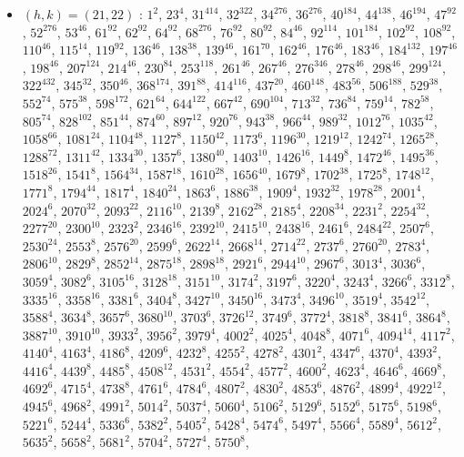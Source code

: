 \begin{itemize}
\item $(h,k)=(21,22)$ : $1^{2}$, $23^{4}$, $31^{414}$, $32^{322}$, $34^{276}$, $36^{276}$, $40^{184}$, $44^{138}$, $46^{194}$, $47^{92}$, $52^{276}$, $53^{46}$, $61^{92}$, $62^{92}$, $64^{92}$, $68^{276}$, $76^{92}$, $80^{92}$, $84^{46}$, $92^{114}$, $101^{184}$, $102^{92}$, $108^{92}$, $110^{46}$, $115^{14}$, $119^{92}$, $136^{46}$, $138^{38}$, $139^{46}$, $161^{70}$, $162^{46}$, $176^{46}$, $183^{46}$, $184^{132}$, $197^{46}$, $198^{46}$, $207^{124}$, $214^{46}$, $230^{84}$, $253^{118}$, $261^{46}$, $267^{46}$, $276^{346}$, $278^{46}$, $298^{46}$, $299^{124}$, $322^{432}$, $345^{32}$, $350^{46}$, $368^{174}$, $391^{88}$, $414^{116}$, $437^{20}$, $460^{148}$, $483^{56}$, $506^{188}$, $529^{38}$, $552^{74}$, $575^{38}$, $598^{172}$, $621^{64}$, $644^{122}$, $667^{42}$, $690^{104}$, $713^{32}$, $736^{84}$, $759^{14}$, $782^{58}$, $805^{74}$, $828^{102}$, $851^{44}$, $874^{60}$, $897^{12}$, $920^{76}$, $943^{38}$, $966^{44}$, $989^{32}$, $1012^{76}$, $1035^{42}$, $1058^{66}$, $1081^{24}$, $1104^{48}$, $1127^{8}$, $1150^{42}$, $1173^{6}$, $1196^{30}$, $1219^{12}$, $1242^{74}$, $1265^{28}$, $1288^{72}$, $1311^{42}$, $1334^{30}$, $1357^{6}$, $1380^{40}$, $1403^{10}$, $1426^{16}$, $1449^{8}$, $1472^{46}$, $1495^{36}$, $1518^{26}$, $1541^{8}$, $1564^{34}$, $1587^{18}$, $1610^{28}$, $1656^{40}$, $1679^{8}$, $1702^{38}$, $1725^{8}$, $1748^{12}$, $1771^{8}$, $1794^{44}$, $1817^{4}$, $1840^{24}$, $1863^{6}$, $1886^{38}$, $1909^{4}$, $1932^{32}$, $1978^{28}$, $2001^{4}$, $2024^{6}$, $2070^{32}$, $2093^{22}$, $2116^{10}$, $2139^{8}$, $2162^{28}$, $2185^{4}$, $2208^{34}$, $2231^{2}$, $2254^{32}$, $2277^{20}$, $2300^{10}$, $2323^{2}$, $2346^{16}$, $2392^{10}$, $2415^{10}$, $2438^{16}$, $2461^{6}$, $2484^{22}$, $2507^{6}$, $2530^{24}$, $2553^{8}$, $2576^{20}$, $2599^{6}$, $2622^{14}$, $2668^{14}$, $2714^{22}$, $2737^{6}$, $2760^{20}$, $2783^{4}$, $2806^{10}$, $2829^{8}$, $2852^{14}$, $2875^{18}$, $2898^{18}$, $2921^{6}$, $2944^{10}$, $2967^{6}$, $3013^{4}$, $3036^{6}$, $3059^{4}$, $3082^{6}$, $3105^{16}$, $3128^{18}$, $3151^{10}$, $3174^{2}$, $3197^{6}$, $3220^{4}$, $3243^{4}$, $3266^{6}$, $3312^{8}$, $3335^{16}$, $3358^{16}$, $3381^{6}$, $3404^{8}$, $3427^{10}$, $3450^{16}$, $3473^{4}$, $3496^{10}$, $3519^{4}$, $3542^{12}$, $3588^{4}$, $3634^{8}$, $3657^{6}$, $3680^{10}$, $3703^{6}$, $3726^{12}$, $3749^{6}$, $3772^{4}$, $3818^{8}$, $3841^{6}$, $3864^{8}$, $3887^{10}$, $3910^{10}$, $3933^{2}$, $3956^{2}$, $3979^{4}$, $4002^{2}$, $4025^{4}$, $4048^{8}$, $4071^{6}$, $4094^{14}$, $4117^{2}$, $4140^{4}$, $4163^{4}$, $4186^{8}$, $4209^{6}$, $4232^{8}$, $4255^{2}$, $4278^{2}$, $4301^{2}$, $4347^{6}$, $4370^{4}$, $4393^{2}$, $4416^{4}$, $4439^{8}$, $4485^{8}$, $4508^{12}$, $4531^{2}$, $4554^{2}$, $4577^{2}$, $4600^{2}$, $4623^{4}$, $4646^{6}$, $4669^{8}$, $4692^{6}$, $4715^{4}$, $4738^{8}$, $4761^{6}$, $4784^{6}$, $4807^{2}$, $4830^{2}$, $4853^{6}$, $4876^{2}$, $4899^{4}$, $4922^{12}$, $4945^{6}$, $4968^{2}$, $4991^{2}$, $5014^{2}$, $5037^{4}$, $5060^{4}$, $5106^{2}$, $5129^{6}$, $5152^{6}$, $5175^{6}$, $5198^{6}$, $5221^{6}$, $5244^{4}$, $5336^{6}$, $5382^{2}$, $5405^{2}$, $5428^{4}$, $5474^{6}$, $5497^{4}$, $5566^{4}$, $5589^{4}$, $5612^{2}$, $5635^{2}$, $5658^{2}$, $5681^{2}$, $5704^{2}$, $5727^{4}$, $5750^{8}$, 
\end{itemize}
